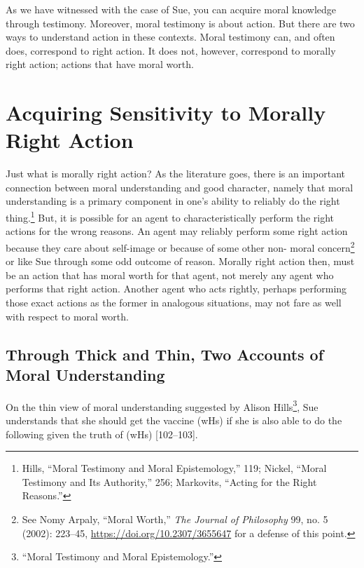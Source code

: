 \documentclass[phdthesis,12pt,final]{wuthesis}
\theoremstyle{definition}
\theoremstyle{definition}
\theoremstyle{definition}
\theoremstyle{definition}
\theoremstyle{remark}
\begin{document}
As we have witnessed with the case of Sue, you can acquire moral knowledge through testimony. Moreover, moral testimony is about action. But there are two ways to understand action in these contexts. Moral testimony can, and often does, correspond to right action. It does not, however, correspond to morally right action; actions that have moral worth.

\section{Acquiring Sensitivity to Morally Right Action}\label{acquiring-sensitivity-to-morally-right-action}

Just what is morally right action? As the literature goes, there is an important connection between moral understanding and good character, namely that moral understanding is a primary component in one's ability to reliably do the right thing.\footnote{Hills, {``Moral Testimony and Moral Epistemology,''} 119; Nickel, {``Moral {Testimony} and Its {Authority},''} 256; Markovits, {``Acting for the {Right Reasons}.''}} But, it is possible for an agent to characteristically perform the right actions for the wrong reasons. An agent may reliably perform some right action because they care about self-image or because of some other non- moral concern\footnote{See Nomy Arpaly, {``Moral {Worth},''} \emph{The Journal of Philosophy} 99, no. 5 (2002): 223--45, \url{https://doi.org/10.2307/3655647} for a defense of this point.} or like Sue through some odd outcome of reason. Morally right action then, must be an action that has moral worth for that agent, not merely any agent who performs that right action. Another agent who acts rightly, perhaps performing those exact actions as the former in analogous situations, may not fare as well with respect to moral worth.

\subsection*{Through Thick and Thin, Two Accounts of Moral Understanding}\label{through-thick-and-thin-two-accounts-of-moral-understanding}

On the thin view of moral understanding suggested by Alison Hills\footnote{{``Moral Testimony and Moral Epistemology.''}}, Sue understands that she should get the vaccine (wHs) if she is also able to do the following given the truth of (wHs) {[}102--103{]}.
\end{document}
